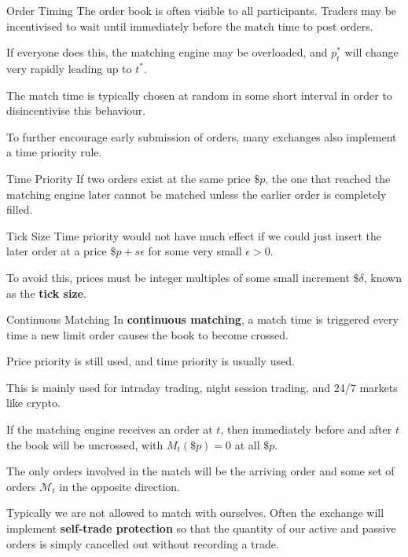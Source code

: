 \documentclass{beamer}
\begin{document}
\begin{frame}{Order Timing}
	The order book is often visible to all participants. Traders may be incentivised to wait until immediately before the match time to post orders.%

	If everyone does this, the matching engine may be overloaded, and $p^*_t$ will change very rapidly leading up to $t^*$.

	\pause

	The match time is typically chosen at random in some short interval in order to disincentivise this behaviour.

	\pause

	To further encourage early submission of orders, many exchanges also implement a time priority rule.%
	\begin{block}{Time Priority}
		If two orders exist at the same price $\$p$, the one that reached the matching engine later cannot be matched unless the earlier order is completely filled.
	\end{block}

	\pause

	\begin{block}{Tick Size}
		Time priority would not have much effect if we could just insert the later order at a price $\$p+s\epsilon$ for some very small $\epsilon>0$.%

		To avoid this, prices must be integer multiples of some small increment $\$\delta$, known as the \textbf{tick size}.%
	\end{block}
\end{frame}

\begin{frame}{Continuous Matching}
	In \textbf{continuous matching}, a match time is triggered every time a new limit order causes the book to become crossed.

	Price priority is still used, and time priority is usually used.

	This is mainly used for intraday trading, night session trading, and 24/7 markets like crypto.

	If the matching engine receives an order at $t$, then immediately before and after $t$ the book will be uncrossed, with $M_t(\$p)=0$ at all $\$p$.

	\pause

	The only orders involved in the match will be the arriving order and some set of orders $\mathcal{M}_t$ in the opposite direction.

	Typically we are not allowed to match with ourselves. Often the exchange will implement \textbf{self-trade protection} so that the quantity of our active and passive orders is simply cancelled out without recording a trade.
\end{frame}
\end{document}
